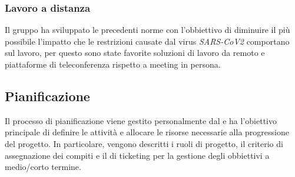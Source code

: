 \subsubsection{Lavoro a distanza}
Il gruppo ha sviluppato le precedenti norme con l'obbiettivo di diminuire il più possibile l'impatto che le restrizioni causate dal virus \textit{SARS-CoV2} comportano sul lavoro, per questo sono state favorite soluzioni di lavoro da remoto e piattaforme di teleconferenza rispetto a meeting in persona.

\subsection{Pianificazione}

Il processo di pianificazione viene gestito personalmente dal \RdP{} e ha l'obiettivo principale di definire le attività e allocare le risorse necessarie alla progressione del progetto. In particolare, vengono descritti i ruoli di progetto, il criterio di assegnazione dei compiti e il  di ticketing per la gestione degli obbiettivi a medio/corto termine.
